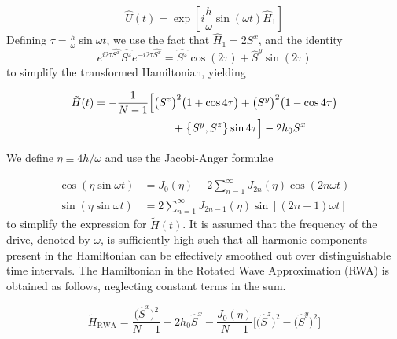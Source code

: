 \documentclass[%
reprint,
superscriptaddress,
amsmath,amssymb,
aps,
prb,
]{revtex4-2}
\begin{document}
	\begin{equation}
	\hat{U}(t)=\exp [i \frac{h}{\omega} \sin (\omega t) \hat{H}_{1}]
	\end{equation}
	Defining $\tau = \displaystyle\frac{h}{\omega}\sin{\omega t}$, we use the fact that $\hat{H}_1 = 2 S^x$, and the identity  
	\begin{equation}
	e^{i 2\tau\hat{S^{x}}} \hat{S^{z}} e^{-i 2\tau \hat{S^{x}}}=\hat{S^{z}} \cos \left(2\tau\right)+\hat{S}^{y} \sin (2\tau)
	\end{equation}
	to simplify the transformed Hamiltonian, yielding
	
	\begin{align}
		\tilde{H}(t)& = -\frac{1}{N-1}\Big[\big(S^z\big)^2 \big(1+\cos{4\tau}\big)+ \big(S^y\big)^2 \big(1-\cos{4\tau}\big)\nonumber \\  
		&\hskip 2.5cm + \big\{S^y, S^z\big\}\sin{4\tau}\Big] - 2 h_0 S^x
	\end{align}
	
	
	We define $\eta\equiv 4h/\omega$ and use the Jacobi-Anger formulae ~\cite{arfkenmath}
	
	\begin{align*}
		\cos(\eta \sin\omega t) &= J_{0}(\eta)+2 \sum_{n=1}^{\infty} J_{2 n}(\eta) \cos (2 n \omega t) \\
		\sin(\eta \sin\omega t) &= 2 \sum_{n=1}^{\infty} J_{2 n-1}(\eta)\sin [(2 n-1) \omega t]
	\end{align*}
	to simplify the expression for $\tilde{H}(t)$. It is assumed that the frequency of the drive, denoted by $\omega$, is sufficiently high such that all harmonic components present in the Hamiltonian can be effectively smoothed out over distinguishable time intervals. The Hamiltonian in the Rotated Wave Approximation (RWA) is obtained as follows, neglecting constant terms in the sum.
	
	\begin{equation}
	\tilde{H}_{\mathrm{RWA}}= \frac{\big(\hat{S}^x\big)^{2}}{N-1} - 2h_0 \hat{S}^x - \frac{J_0(\eta)}{N-1}\bigg[\big(\hat{S}^z\big)^{2} - \big(\hat{S}^y\big)^{2} \bigg]
	\end{equation}
	
\end{document}
